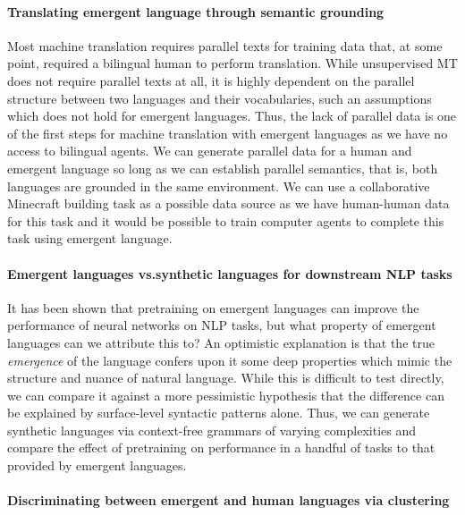 \paragraph{Translating emergent language through semantic grounding}
Most machine translation requires parallel texts for training data that, at some point, required a bilingual human to perform translation.
While unsupervised MT does not require parallel texts at all, it is highly dependent on the parallel structure between two languages and their vocabularies, such an assumptions which does not hold for emergent languages.
Thus, the lack of parallel data is one of the first steps for machine translation with emergent languages as we have no access to bilingual agents.
We can generate parallel data for a human and emergent language so long as we can establish parallel semantics, that is, both languages are grounded in the same environment.
We can use a collaborative Minecraft building task as a possible data source as we have human-human data for this task and it would be possible to train computer agents to complete this task using emergent language.

\paragraph{Emergent languages vs.\@ synthetic languages for downstream NLP tasks}
It has been shown that pretraining on emergent languages can improve the performance of neural networks on NLP tasks, but what property of emergent languages can we attribute this to?
An optimistic explanation is that the true \emph{emergence} of the language confers upon it some deep properties which mimic the structure and nuance of natural language.
While this is difficult to test directly, we can compare it against a more pessimistic hypothesis that the difference can be explained by surface-level syntactic patterns alone.
Thus, we can generate synthetic languages via context-free grammars of varying complexities and compare the effect of pretraining on performance in a handful of tasks to that provided by emergent languages.

\paragraph{Discriminating between emergent and human languages via clustering}

